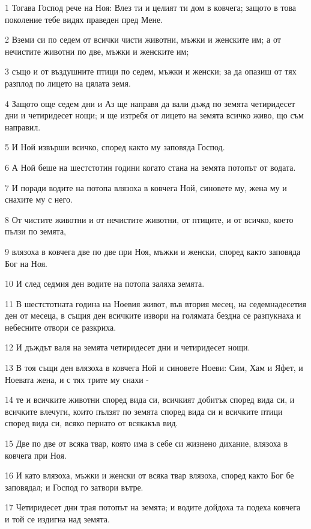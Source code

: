 \par 1 Тогава Господ рече на Ноя: Влез ти и целият ти дом в ковчега; защото в това поколение тебе видях праведен пред Мене.
\par 2 Вземи си по седем от всички чисти животни, мъжки и женските им; а от нечистите животни по две, мъжки и женските им;
\par 3 също и от въздушните птици по седем, мъжки и женски; за да опазиш от тях разплод по лицето на цялата земя.
\par 4 Защото още седем дни и Аз ще направя да вали дъжд по земята четиридесет дни и четиридесет нощи; и ще изтребя от лицето на земята всичко живо, що съм направил.
\par 5 И Ной извърши всичко, според както му заповяда Господ.
\par 6 А Ной беше на шестстотин години когато стана на земята потопът от водата.
\par 7 И поради водите на потопа влязоха в ковчега Ной, синовете му, жена му и снахите му с него.
\par 8 От чистите животни и от нечистите животни, от птиците, и от всичко, което пълзи по земята,
\par 9 влязоха в ковчега две по две при Ноя, мъжки и женски, според както заповяда Бог на Ноя.
\par 10 И след седмия ден водите на потопа заляха земята.
\par 11 В шестстотната година на Ноевия живот, във втория месец, на седемнадесетия ден от месеца, в същия ден всичките извори на голямата бездна се разпукнаха и небесните отвори се разкриха.
\par 12 И дъждът валя на земята четиридесет дни и четиридесет нощи.
\par 13 В тоя същи ден влязоха в ковчега Ной и синовете Ноеви: Сим, Хам и Яфет, и Ноевата жена, и с тях трите му снахи -
\par 14 те и всичките животни според вида си, всичкият добитък според вида си, и всичките влечуги, които пълзят по земята според вида си и всичките птици според вида си, всяко пернато от всякакъв вид.
\par 15 Две по две от всяка твар, която има в себе си жизнено дихание, влязоха в ковчега при Ноя.
\par 16 И като влязоха, мъжки и женски от всяка твар влязоха, според както Бог бе заповядал; и Господ го затвори вътре.
\par 17 Четиридесет дни трая потопът на земята; и водите дойдоха та подеха ковчега и той се издигна над земята.
